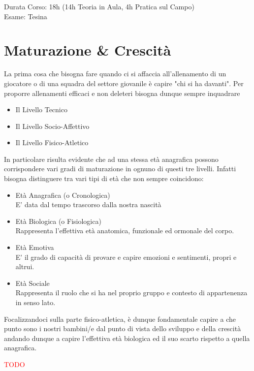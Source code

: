 \documentclass[../uefaC.tex]{subfiles}
\begin{document}
\onlyinsubfile{\maketitle}

\onlyinsubfile{}

\onlyinsubfile{\tableofcontents}


Durata Corso: 18h (14h Teoria in Aula, 4h Pratica sul Campo) \hfill \\
Esame: Tesina

\section{Maturazione \& Crescità}

La prima cosa che bisogna fare quando ci si affaccia all'allenamento di un giocatore o di una squadra del settore giovanile è capire "chi si ha davanti". Per proporre allenamenti efficaci e non deleteri bisogna dunque sempre inquadrare
\begin{itemize}
    \item{Il Livello Tecnico}
    \item{Il Livello Socio-Affettivo}
    \item{Il Livello Fisico-Atletico}
\end{itemize}

In particolare risulta evidente che ad una stessa età anagrafica possono corrispondere vari gradi di maturazione in ognuno di questi tre livelli. Infatti bisogna distinguere tra vari tipi di età che non sempre coincidono:
\begin{itemize}
    \item{Età Anagrafica (o Cronologica)}\hfill \\E' data dal tempo trascorso dalla nostra nascità
    \item{Età Biologica (o Fisiologica)}\hfill \\Rappresenta l'effettiva età anatomica, funzionale ed ormonale del corpo.
    \item{Età Emotiva}\hfill \\E' il grado di capacità di provare e capire emozioni e sentimenti, propri e altrui.
    \item{Età Sociale}\hfill \\Rappresenta il ruolo che si ha nel proprio gruppo e contesto di appartenenza in senso lato.
\end{itemize}

Focalizzandoci sulla parte fisico-atletica, è dunque fondamentale capire a che punto sono i nostri bambini/e dal punto di vista dello sviluppo e della crescità andando dunque a capire l'effettiva età biologica ed il suo scarto rispetto a quella anagrafica.

\textcolor{red}{TODO}
\end{document}
